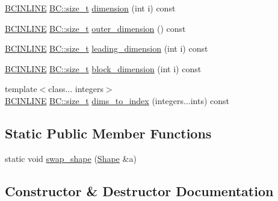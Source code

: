 \begin{DoxyCompactItemize}
\item 
\hyperlink{BlackCat__Common_8h_a6699e8b0449da5c0fafb878e59c1d4b1}{B\+C\+I\+N\+L\+I\+NE} \hyperlink{namespaceBC_a6007cbc4eeec401a037b558910a56173}{B\+C\+::size\+\_\+t} \hyperlink{structBC_1_1tensors_1_1exprs_1_1Shape_3_010_01_4_a5a1bb1800d05653c5f8915898339cb8a}{dimension} (int i) const 
\item 
\hyperlink{BlackCat__Common_8h_a6699e8b0449da5c0fafb878e59c1d4b1}{B\+C\+I\+N\+L\+I\+NE} \hyperlink{namespaceBC_a6007cbc4eeec401a037b558910a56173}{B\+C\+::size\+\_\+t} \hyperlink{structBC_1_1tensors_1_1exprs_1_1Shape_3_010_01_4_a46aab844af5ac6053e0b4c79a502c511}{outer\+\_\+dimension} () const 
\item 
\hyperlink{BlackCat__Common_8h_a6699e8b0449da5c0fafb878e59c1d4b1}{B\+C\+I\+N\+L\+I\+NE} \hyperlink{namespaceBC_a6007cbc4eeec401a037b558910a56173}{B\+C\+::size\+\_\+t} \hyperlink{structBC_1_1tensors_1_1exprs_1_1Shape_3_010_01_4_af3d9b0f66acf606e29877027a0d9ba10}{leading\+\_\+dimension} (int i) const 
\item 
\hyperlink{BlackCat__Common_8h_a6699e8b0449da5c0fafb878e59c1d4b1}{B\+C\+I\+N\+L\+I\+NE} \hyperlink{namespaceBC_a6007cbc4eeec401a037b558910a56173}{B\+C\+::size\+\_\+t} \hyperlink{structBC_1_1tensors_1_1exprs_1_1Shape_3_010_01_4_a04f1f9571e4c345f7f6c96562f1dfe77}{block\+\_\+dimension} (int i) const 
\item 
{\footnotesize template$<$class... integers$>$ }\\\hyperlink{BlackCat__Common_8h_a6699e8b0449da5c0fafb878e59c1d4b1}{B\+C\+I\+N\+L\+I\+NE} \hyperlink{namespaceBC_a6007cbc4eeec401a037b558910a56173}{B\+C\+::size\+\_\+t} \hyperlink{structBC_1_1tensors_1_1exprs_1_1Shape_3_010_01_4_a542d1ca4398400e9147e8be30fbfaca5}{dims\+\_\+to\+\_\+index} (integers...\+ints) const 
\end{DoxyCompactItemize}
\subsection*{Static Public Member Functions}
\begin{DoxyCompactItemize}
\item 
static void \hyperlink{structBC_1_1tensors_1_1exprs_1_1Shape_3_010_01_4_af43eaa7b9dff3a58592566eb1542f5a0}{swap\+\_\+shape} (\hyperlink{classBC_1_1tensors_1_1exprs_1_1Shape}{Shape} \&a)
\end{DoxyCompactItemize}


\subsection{Constructor \& Destructor Documentation}
